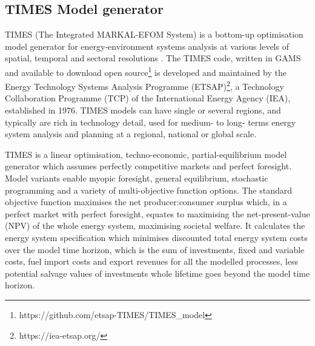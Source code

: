 \documentclass[journal abbreviation, manuscript]{copernicus}
\begin{document}
\subsection{TIMES Model generator}
\label{ss:times_code}
TIMES (The Integrated MARKAL-EFOM System) is a bottom-up optimisation model generator for energy-environment systems analysis at various levels of spatial, temporal and sectoral resolutions \cite{IEA-ETSAP2020a}. The TIMES code, written in GAMS and available to download open source\footnote{https://github.com/etsap-TIMES/TIMES\_model} is developed and maintained by the Energy Technology Systems Analysis Programme (ETSAP)\footnote{https://iea-etsap.org/}, a Technology Collaboration Programme (TCP) of the International Energy Agency (IEA), established in 1976. TIMES models can have single or several regions, and typically are rich in technology detail, used for medium- to long- terms energy system analysis and planning at a regional, national or global scale. 

TIMES is a linear optimisation, techno-economic, partial-equilibrium model generator which assumes perfectly competitive markets and perfect foresight. Model variants enable myopic foresight, general equilibrium, stochastic programming and a variety of multi-objective function options. The standard objective function maximises the net producer:consumer surplus which, in a perfect market with perfect foresight, equates to maximising the net-present-value (NPV) of the whole energy system, maximising societal welfare. It calculates the energy system specification which minimises discounted total energy system costs over the model time horizon, which is the sum of investments, fixed and variable costs, fuel import costs and export revenues for all the modelled processes, less potential salvage values of investments whole lifetime goes beyond the model time horizon. 
\end{document}
